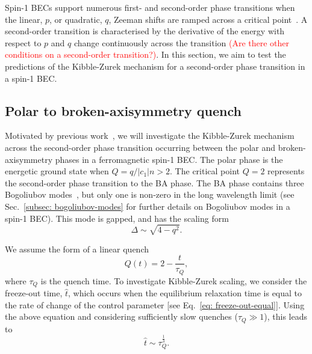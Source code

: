 Spin-1 BECs support numerous first- and second-order phase transitions
when the linear, \( p \), or quadratic, \( q \), Zeeman shifts are
ramped across a critical point~\cite{Kawaguchi2012}.
A second-order transition is characterised by the derivative of the energy with
respect to \( p \) and \( q \) change continuously across the transition
\textcolor{red}{(Are there other conditions on a second-order transition?)}.
In this section, we aim to test the predictions of the Kibble-Zurek mechanism
for a second-order phase transition in a spin-1 BEC\@.

\subsection{Polar to broken-axisymmetry quench}\label{sec: KZM-second-order-numerics}
Motivated by previous work~\cite{Damski2007}, we will investigate the
Kibble-Zurek mechanism across the second-order phase transition occurring
between the polar and broken-axisymmetry phases in a ferromagnetic spin-1 BEC\@.
The polar phase is the energetic ground state when \( Q=q/|c_1|n > 2 \).
The critical point \( Q = 2 \) represents the second-order phase transition to
the BA phase.
The BA phase contains three Bogoliubov modes~\cite{Uchino2010}, but only one
is non-zero in the long wavelength limit (see
Sec.~\ref{subsec: bogoliubov-modes} for further details on Bogoliubov modes in
a spin-1 BEC).
This mode is gapped, and has the scaling form
\begin{equation}
    \Delta \sim \sqrt{4 - q^2}.
\end{equation}

We assume the form of a linear quench
\begin{equation}
    Q(t) = 2 - \frac{t}{\tau_Q},
    \label{eq: time-dep-Q-damski}
\end{equation}
where \( \tau_Q \) is the quench time.
To investigate Kibble-Zurek scaling, we consider the freeze-out time,
\( \hat{t} \), which occurs when the equilibrium relaxation time is equal to the
rate of change of the control parameter [see Eq.~\eqref{eq: freeze-out-equal}].
Using the above equation and considering sufficiently slow quenches
(\(\tau_Q \gg 1\)), this leads to
\begin{equation}
    \hat{t} \sim \tau_Q^{\frac{1}{3}}.
\end{equation}

